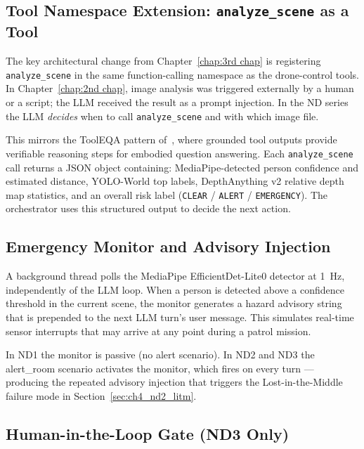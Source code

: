 \subsection{Tool Namespace Extension: \texttt{analyze\_scene} as a Tool}
\label{sec:ch4_proposed_tool}

The key architectural change from Chapter~\ref{chap:3rd chap} is registering
\texttt{analyze\_scene} in the same function-calling namespace as the drone-control tools.
In Chapter~\ref{chap:2nd chap}, image analysis was triggered externally by a human or a
script; the LLM received the result as a prompt injection.  In the ND series the LLM
\emph{decides} when to call \texttt{analyze\_scene} and with which image file.

This mirrors the ToolEQA pattern of~\citet{embodiedqa2025}, where grounded tool outputs
provide verifiable reasoning steps for embodied question answering.  Each
\texttt{analyze\_scene} call returns a JSON object containing: MediaPipe-detected person
confidence and estimated distance, YOLO-World top labels, DepthAnything v2 relative depth
map statistics, and an overall risk label (\texttt{CLEAR} / \texttt{ALERT} /
\texttt{EMERGENCY}).  The orchestrator uses this structured output to decide the next
action.

\subsection{Emergency Monitor and Advisory Injection}
\label{sec:ch4_proposed_monitor}

A background thread polls the MediaPipe EfficientDet-Lite0 detector at 1~Hz, independently
of the LLM loop.  When a person is detected above a confidence threshold in the current
scene, the monitor generates a hazard advisory string that is prepended to the next LLM
turn's user message.  This simulates real-time sensor interrupts that may arrive at any
point during a patrol mission.

In ND1 the monitor is passive (no alert scenario).  In ND2 and ND3 the alert\_room scenario
activates the monitor, which fires on every turn --- producing the repeated advisory
injection that triggers the Lost-in-the-Middle failure mode in Section~\ref{sec:ch4_nd2_litm}.

\subsection{Human-in-the-Loop Gate (ND3 Only)}
\label{sec:ch4_proposed_hitl}


